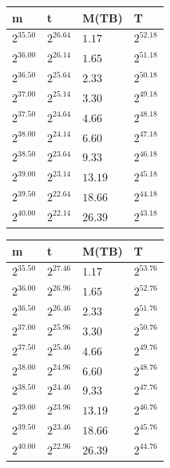 \begin{table}[h!]\centering
  \begin{tabular}{llll}
    m & t & M(TB) & T \\ \hline
    $2^{35.50}$ & $2^{26.64}$ & $1.17$ & $2^{52.18}$ \\
    $2^{36.00}$ & $2^{26.14}$ & $1.65$ & $2^{51.18}$ \\
    $2^{36.50}$ & $2^{25.64}$ & $2.33$ & $2^{50.18}$ \\
    $2^{37.00}$ & $2^{25.14}$ & $3.30$ & $2^{49.18}$ \\
    $2^{37.50}$ & $2^{24.64}$ & $4.66$ & $2^{48.18}$ \\
    $2^{38.00}$ & $2^{24.14}$ & $6.60$ & $2^{47.18}$ \\
    $2^{38.50}$ & $2^{23.64}$ & $9.33$ & $2^{46.18}$ \\
    $2^{39.00}$ & $2^{23.14}$ & $13.19$ & $2^{45.18}$ \\
    $2^{39.50}$ & $2^{22.64}$ & $18.66$ & $2^{44.18}$ \\
    $2^{40.00}$ & $2^{22.14}$ & $26.39$ & $2^{43.18}$ \\
  \end{tabular}
\end{table}

\begin{table}[h!]\centering
  \begin{tabular}{llll}
    m & t & M(TB) & T \\ \hline
    $2^{35.50}$ & $2^{27.46}$ & $1.17$ & $2^{53.76}$ \\
    $2^{36.00}$ & $2^{26.96}$ & $1.65$ & $2^{52.76}$ \\
    $2^{36.50}$ & $2^{26.46}$ & $2.33$ & $2^{51.76}$ \\
    $2^{37.00}$ & $2^{25.96}$ & $3.30$ & $2^{50.76}$ \\
    $2^{37.50}$ & $2^{25.46}$ & $4.66$ & $2^{49.76}$ \\
    $2^{38.00}$ & $2^{24.96}$ & $6.60$ & $2^{48.76}$ \\
    $2^{38.50}$ & $2^{24.46}$ & $9.33$ & $2^{47.76}$ \\
    $2^{39.00}$ & $2^{23.96}$ & $13.19$ & $2^{46.76}$ \\
    $2^{39.50}$ & $2^{23.46}$ & $18.66$ & $2^{45.76}$ \\
    $2^{40.00}$ & $2^{22.96}$ & $26.39$ & $2^{44.76}$ \\
  \end{tabular}
\end{table}

